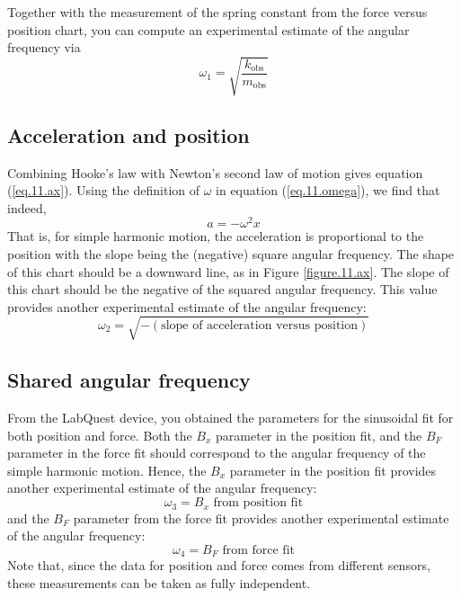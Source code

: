 Together with the measurement of the spring constant from the force versus position chart, you can compute an experimental estimate of the angular frequency via
\begin{equation}
    \omega_{1} = \sqrt{\frac{k_{\text{obs}}}{m_{\text{obs}}}}
\end{equation}
%
\subsection{Acceleration and position}
%
Combining Hooke's law with Newton's second law of motion gives equation (\ref{eq.11.ax}). Using the definition of $\omega$ in equation (\ref{eq.11.omega}), we find that indeed,
\begin{equation}
    a = -\omega^{2}x
\end{equation}
That is, for simple harmonic motion, the acceleration is proportional to the position with the slope being the (negative) square angular frequency. The shape of this chart should be a downward line, as in Figure \ref{figure.11.ax}. The slope of this chart should be the negative of the squared angular frequency. This value provides another experimental estimate of the angular frequency:
\begin{equation}
    \omega_{2} = \sqrt{- (\text{slope of acceleration versus position})}
\end{equation}
%
\subsection{Shared angular frequency}
%
From the LabQuest device, you obtained the parameters for the sinusoidal fit for both position and force. Both the $B_{x}$ parameter in the position fit, and the $B_{F}$ parameter in the force fit should correspond to the angular frequency of the simple harmonic motion. Hence, the $B_{x}$ parameter in the position fit provides another experimental estimate of the angular frequency:
\begin{equation}
    \omega_{3} = B_{x} \text{ from position fit}
\end{equation}
and the $B_{F}$ parameter from the force fit provides another experimental estimate of the angular frequency:
\begin{equation}
    \omega_{4} = B_{F} \text{ from force fit}
\end{equation}
Note that, since the data for position and force comes from different sensors, these measurements can be taken as fully independent.

